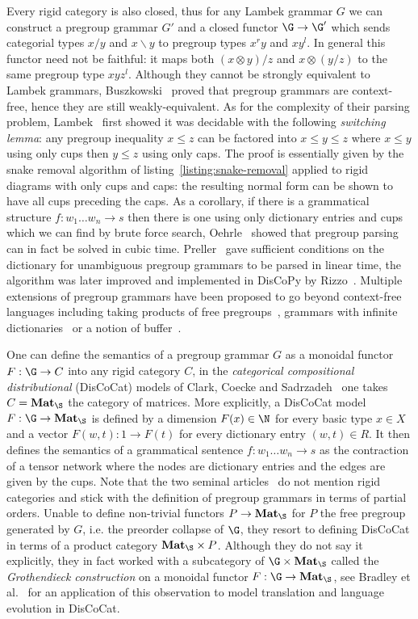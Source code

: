 Every rigid category is also closed, thus for any Lambek grammar $G$ we can construct a pregroup grammar $G'$ and a closed functor $\G \to \G'$ which sends categorial types $x / y$ and $x \backslash y$ to pregroup types $x^r y$ and $x y^l$.
In general this functor need not be faithful: it maps both $(x \otimes y) / z$ and $x \otimes (y / z)$ to the same pregroup type $x y z^l$.
Although they cannot be strongly equivalent to Lambek grammars, Buszkowski~\cite{Buszkowski01} proved that pregroup grammars are context-free, hence they are still weakly-equivalent.
As for the complexity of their parsing problem, Lambek~\cite{Lambek99} first showed it was decidable with the following \emph{switching lemma}: any pregroup inequality $x \leq z$ can be factored into $x \leq y \leq z$ where $x \leq y$ using only cups then $y \leq z$ using only caps.
The proof is essentially given by the snake removal algorithm of listing~\ref{listing:snake-removal} applied to rigid diagrams with only cups and caps: the resulting normal form can be shown to have all cups preceding the caps.
As a corollary, if there is a grammatical structure $f : w_1 \dots w_n \to s$ then there is one using only dictionary entries and cups which we can find by brute force search, Oehrle~\cite{Oehrle04} showed that pregroup parsing can in fact be solved in cubic time.
Preller~\cite{Preller07a} gave sufficient conditions on the dictionary for unambiguous pregroup grammars to be parsed in linear time, the algorithm was later improved and implemented in DisCoPy by Rizzo~\cite{Rizzo21}.
Multiple extensions of pregroup grammars have been proposed to go beyond context-free languages including taking products of free pregroups~\cite[Section~28]{Lambek08}, grammars with infinite dictionaries~\cite{Preller10} or a notion of buffer~\cite{GenkinEtAl10}.

One can define the semantics of a pregroup grammar $G$ as a monoidal functor $F : \G \to C$ into any rigid category $C$, in the \emph{categorical compositional distributional} (DisCoCat) models of Clark, Coecke and Sadrzadeh~\cite{ClarkEtAl08,ClarkEtAl10} one takes $C = \mathbf{Mat}_\S$ the category of matrices.
More explicitly, a DisCoCat model $F : \G \to \mathbf{Mat}_\S$ is defined by a dimension $F(x) \in \N$ for every basic type $x \in X$ and a vector $F(w, t) : 1 \to F(t)$ for every dictionary entry $(w, t) \in R$.
It then defines the semantics of a grammatical sentence $f : w_1 \dots w_n \to s$ as the contraction of a tensor network where the nodes are dictionary entries and the edges are given by the cups.
Note that the two seminal articles~\cite{ClarkEtAl08,ClarkEtAl10} do not mention rigid categories and stick with the definition of pregroup grammars in terms of partial orders.
Unable to define non-trivial functors $P \to \mathbf{Mat}_\S$ for $P$ the free pregroup generated by $G$, i.e. the preorder collapse of $\G$, they resort to defining DisCoCat in terms of a product category $\mathbf{Mat}_\S \times P$.
Although they do not say it explicitly, they in fact worked with a subcategory of $\G \times \mathbf{Mat}_\S$ called the \emph{Grothendieck construction} on a monoidal functor $F : \G \to \mathbf{Mat}_\S$, see Bradley et al.~\cite{BradleyEtAl18} for an application of this observation to model translation and language evolution in DisCoCat.

